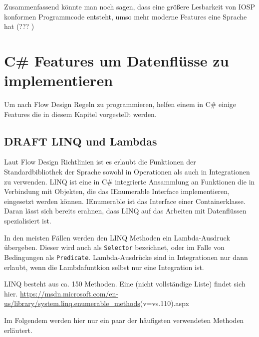 \documentclass[a4paper,12pt,oneside]{book}
\begin{document}
Zusammenfassend könnte man noch sagen, dass eine größere Lesbarkeit von IOSP konformen Programmcode entsteht, umso mehr moderne
Features eine Sprache hat (??? )
\section{C\# Features um Datenflüsse zu implementieren}
\label{sec-4-3}
Um nach Flow Design Regeln zu programmieren, helfen einem in C\# einige Features die in diesem Kapitel vorgestellt werden.

\subsection{DRAFT LINQ und Lambdas}
\label{sec-4-3-1}
Laut Flow Design Richtlinien ist es erlaubt die Funktionen der
Standardbibliothek der Sprache sowohl in Operationen als auch in Integrationen
zu verwenden. LINQ ist eine in C\# integrierte Ansammlung an Funktionen die in Verbindung mit
Objekten, die das IEnumerable Interface implementieren, eingesetzt werden
können.
IEnumerable ist das Interface einer Containerklasse. Daran lässt sich bereits erahnen, dass LINQ
auf das Arbeiten mit Datenflüssen spezialisiert ist.

In den meisten Fällen werden den LINQ Methoden ein Lambda-Ausdruck übergeben.
Dieser wird auch als \texttt{Selector} bezeichnet, oder im Falle von Bedingungen als \texttt{Predicate}.
Lambda-Ausdrücke sind in Integrationen nur dann erlaubt, wenn die Lambdafuntkion
selbst nur eine Integration ist.

LINQ besteht aus ca. 150 Methoden.
Eine (nicht vollständige Liste) findet sich hier.
\url{https://msdn.microsoft.com/en-us/library/system.linq.enumerable_methods}(v=vs.110).aspx

Im Folgendem werden hier nur ein paar der häufigsten verwendeten Methoden erläutert.
\end{document}
